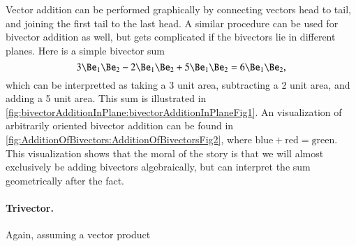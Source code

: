 Vector addition can be performed graphically by connecting vectors head to tail, and joining the first tail to the last head.  A similar procedure can be used for bivector addition as well, but gets complicated if the bivectors lie in different planes.  Here is a simple bivector sum
\begin{dmath}\label{eqn:multivector:160}
3 \Be_1 \Be_2 - 2 \Be_1 \Be_2 + 5 \Be_1 \Be_2 = 6 \Be_1 \Be_2,
\end{dmath}
which can be interpretted as taking a 3 unit area, subtracting a 2 unit area, and adding a 5 unit area.  This sum is illustrated in
\cref{fig:bivectorAdditionInPlane:bivectorAdditionInPlaneFig1}.
An visualization of arbitrarily oriented bivector addition can be found in
\cref{fig:AdditionOfBivectors:AdditionOfBivectorsFig2}, where \( \text{blue} + \text{red} = \text{green} \).  This visualization shows that the
moral of the story is that we will almost exclusively be adding bivectors algebraically, but can interpret the sum geometrically after the fact.

\paragraph{Trivector.}

Again, assuming a vector product


